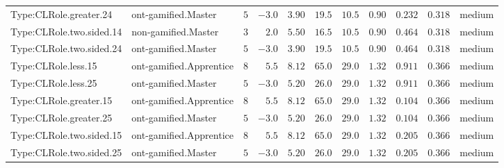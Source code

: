 \documentclass[6pt,a4paper]{article}
\begin{document}
{\begin{longtable}{llrrrrrrrrl}
Type:CLRole.greater.24&ont-gamified.Master&$ 5$&$-3.0$&$ 3.90$&$ 19.5$&$10.5$&$ 0.90$&$0.232$&$0.318$&medium\tabularnewline
Type:CLRole.two.sided.14&non-gamified.Master&$ 3$&$ 2.0$&$ 5.50$&$ 16.5$&$10.5$&$ 0.90$&$0.464$&$0.318$&medium\tabularnewline
Type:CLRole.two.sided.24&ont-gamified.Master&$ 5$&$-3.0$&$ 3.90$&$ 19.5$&$10.5$&$ 0.90$&$0.464$&$0.318$&medium\tabularnewline
Type:CLRole.less.15&ont-gamified.Apprentice&$ 8$&$ 5.5$&$ 8.12$&$ 65.0$&$29.0$&$ 1.32$&$0.911$&$0.366$&medium\tabularnewline
Type:CLRole.less.25&ont-gamified.Master&$ 5$&$-3.0$&$ 5.20$&$ 26.0$&$29.0$&$ 1.32$&$0.911$&$0.366$&medium\tabularnewline
Type:CLRole.greater.15&ont-gamified.Apprentice&$ 8$&$ 5.5$&$ 8.12$&$ 65.0$&$29.0$&$ 1.32$&$0.104$&$0.366$&medium\tabularnewline
Type:CLRole.greater.25&ont-gamified.Master&$ 5$&$-3.0$&$ 5.20$&$ 26.0$&$29.0$&$ 1.32$&$0.104$&$0.366$&medium\tabularnewline
\newpage
Type:CLRole.two.sided.15&ont-gamified.Apprentice&$ 8$&$ 5.5$&$ 8.12$&$ 65.0$&$29.0$&$ 1.32$&$0.205$&$0.366$&medium\tabularnewline
Type:CLRole.two.sided.25&ont-gamified.Master&$ 5$&$-3.0$&$ 5.20$&$ 26.0$&$29.0$&$ 1.32$&$0.205$&$0.366$&medium\tabularnewline
\hline
\end{longtable}}
\end{document}
